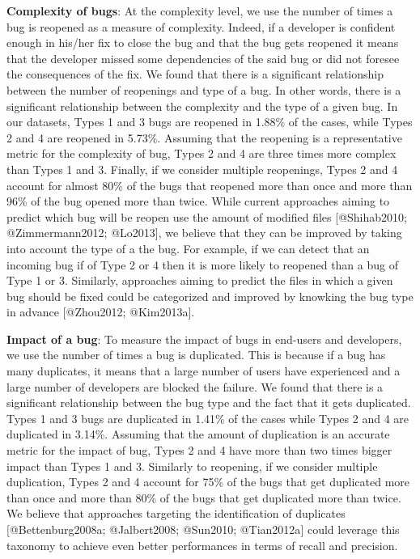 {\textbf{Complexity of bugs}}: At the complexity level, we use the
number of times a bug is reopened as a measure of complexity. Indeed, if
a developer is confident enough in his/her fix to close the bug and that
the bug gets reopened it means that the developer missed some
dependencies of the said bug or did not foresee the consequences of the
fix. We found that there is a significant relationship between the
number of reopenings and type of a bug. In other words, there is a
significant relationship between the complexity and the type of a given
bug. In our datasets, Types 1 and 3 bugs are reopened in 1.88\% of the
cases, while Types 2 and 4 are reopened in 5.73\%. Assuming that the
reopening is a representative metric for the complexity of bug, Types 2
and 4 are three times more complex than Types 1 and 3. Finally, if we
consider multiple reopenings, Types 2 and 4 account for almost 80\% of
the bugs that reopened more than once and more than 96\% of the bug
opened more than twice. While current approaches aiming to predict which
bug will be reopen use the amount of modified files {[}@Shihab2010;
@Zimmermann2012; @Lo2013{]}, we believe that they can be improved by
taking into account the type of a the bug. For example, if we can detect
that an incoming bug if of Type 2 or 4 then it is more likely to
reopened than a bug of Type 1 or 3. Similarly, approaches aiming to
predict the files in which a given bug should be fixed could be
categorized and improved by knowking the bug type in advance
{[}@Zhou2012; @Kim2013a{]}.

{\textbf{Impact of a bug}}: To measure the impact of bugs in end-users
and developers, we use the number of times a bug is duplicated. This is
because if a bug has many duplicates, it means that a large number of
users have experienced and a large number of developers are blocked the
failure. We found that there is a significant relationship between the
bug type and the fact that it gets duplicated. Types 1 and 3 bugs are
duplicated in 1.41\% of the cases while Types 2 and 4 are duplicated in
3.14\%. Assuming that the amount of duplication is an accurate metric
for the impact of bug, Types 2 and 4 have more than two times bigger
impact than Types 1 and 3. Similarly to reopening, if we consider
multiple duplication, Types 2 and 4 account for 75\% of the bugs that
get duplicated more than once and more than 80\% of the bugs that get
duplicated more than twice. We believe that approaches targeting the
identification of duplicates {[}@Bettenburg2008a; @Jalbert2008;
@Sun2010; @Tian2012a{]} could leverage this taxonomy to achieve even
better performances in terms of recall and precision.

